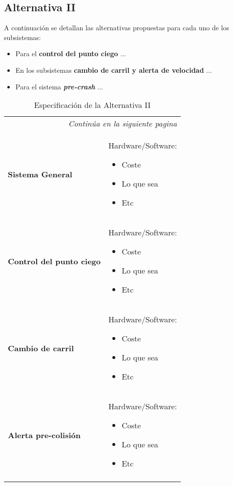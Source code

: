 \subsection{Alternativa II}

\par A continuación se detallan las alternativas propuestas para cada uno de los subsistemas:

\begin{itemize}[-]
    \item Para el \textbf{control del punto ciego} ...
    \item En los subsistemas \textbf{cambio de carril y alerta de velocidad} ...
    \item Para el sistema \textbf{\textit{pre-crash}} ...
\end{itemize}

\begin{center}
\begin{longtable}{p{5cm} p{8cm}}

\hline
\endfirsthead
\hline
\endhead

\hline \multicolumn{2}{r}{\textit{Continúa en la siguiente pagina}} \\
\endfoot
\endlastfoot

\textbf{Sistema General} &
Hardware/Software:
\begin{itemize}
    \item Coste
    \item Lo que sea
    \item Etc
\end{itemize}
\\ \hline

\textbf{Control del punto ciego} &
Hardware/Software:
\begin{itemize}
    \item Coste
    \item Lo que sea
    \item Etc
\end{itemize}
\\ \hline

\textbf{Cambio de carril} &
Hardware/Software:
\begin{itemize}
    \item Coste
    \item Lo que sea
    \item Etc
\end{itemize}
\\ \hline

\textbf{Alerta pre-colisión} &
Hardware/Software:
\begin{itemize}
    \item Coste
    \item Lo que sea
    \item Etc
\end{itemize}

\\ \hline
\caption{Especificación de la Alternativa II}
\label{tab:altII}
\end{longtable}
\end{center}
